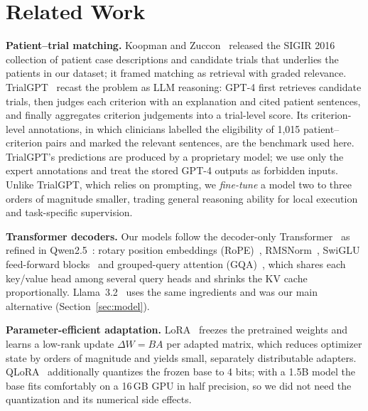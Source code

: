 \section{Related Work}
\label{sec:related}

\textbf{Patient--trial matching.} Koopman and Zuccon~\cite{koopman2016test} released the SIGIR 2016
collection of patient case descriptions and candidate trials that underlies the patients in our
dataset; it framed matching as retrieval with graded relevance. TrialGPT~\cite{jin2024trialgpt}
recast the problem as LLM reasoning: GPT-4 first retrieves candidate trials, then judges each
criterion with an explanation and cited patient sentences, and finally aggregates criterion
judgements into a trial-level score. Its criterion-level annotations, in which clinicians labelled
the eligibility of 1,015 patient--criterion pairs and marked the relevant sentences, are the
benchmark used here. TrialGPT's predictions are produced by a proprietary model; we use only the
expert annotations and treat the stored GPT-4 outputs as forbidden inputs. Unlike TrialGPT, which
relies on prompting, we \emph{fine-tune} a model two to three orders of magnitude smaller, trading
general reasoning ability for local execution and task-specific supervision.

\textbf{Transformer decoders.} Our models follow the decoder-only Transformer~\cite{vaswani2017attention}
as refined in Qwen2.5~\cite{qwen2024qwen25}: rotary position embeddings (RoPE)~\cite{su2024roformer},
RMSNorm~\cite{zhang2019rmsnorm}, SwiGLU feed-forward blocks~\cite{shazeer2020glu} and grouped-query
attention (GQA)~\cite{ainslie2023gqa}, which shares each key/value head among several query heads and
shrinks the KV cache proportionally. Llama~3.2~\cite{grattafiori2024llama3} uses the same ingredients
and was our main alternative (Section~\ref{sec:model}).

\textbf{Parameter-efficient adaptation.} LoRA~\cite{hu2022lora} freezes the pretrained weights and
learns a low-rank update $\Delta W = BA$ per adapted matrix, which reduces optimizer state by orders
of magnitude and yields small, separately distributable adapters. QLoRA~\cite{dettmers2023qlora}
additionally quantizes the frozen base to 4 bits; with a 1.5B model the base fits comfortably on a
16\,GB GPU in half precision, so we did not need the quantization and its numerical side effects.

